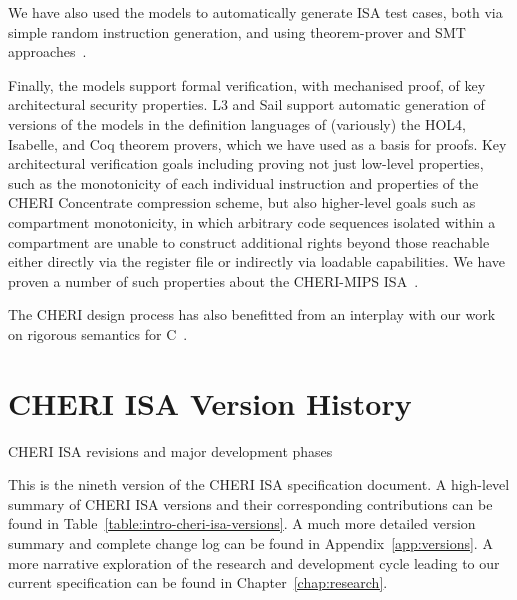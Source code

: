 We have also used the models to automatically generate ISA test cases,
both via simple random instruction generation, and using
theorem-prover and SMT approaches~\cite{DBLP:journals/scp/CampbellS16}.


Finally, the models support formal verification, with mechanised
proof, of key architectural security properties.
L3 and Sail support automatic generation of versions of the models in
the definition languages of (variously) the
HOL4, Isabelle, and Coq theorem provers, which we have used as a basis
for proofs.
Key architectural verification goals including proving not just low-level
properties, such as the monotonicity of each individual instruction
and properties of the CHERI Concentrate compression scheme, but also
higher-level goals such as compartment monotonicity, in which arbitrary code
sequences isolated within a compartment are unable to construct additional
rights beyond those reachable either directly via the register file or
indirectly via loadable capabilities.
We have proven a number of such properties about the CHERI-MIPS ISA~\cite{cheri-formal-SP2020,UCAM-CL-TR-940}.

The CHERI design process has also benefitted from an interplay with
our work on rigorous semantics for C~\cite{Cerberus-PLDI16,cerberus-popl2019}.


\section{CHERI ISA Version History}


\begin{table}[th!]
\begin{center}
\caption{CHERI ISA revisions and major development phases}

\end{center}
\label{table:intro-cheri-isa-versions}
\end{table}

This is the nineth version of the CHERI ISA specification document.
A high-level summary of CHERI ISA versions and their corresponding
contributions can be found in Table~\ref{table:intro-cheri-isa-versions}.
A much more detailed version summary and complete change log can be found in
Appendix~\ref{app:versions}.
A more narrative exploration of the research and development cycle leading to
our current specification can be found in Chapter~\ref{chap:research}.

